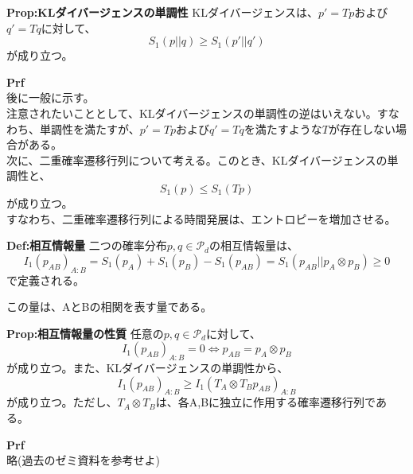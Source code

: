 \documentclass[a4paper,11pt]{jsarticle}
\numberwithin{equation}{section}
\begin{document}
\begin{itembox}[l]{\textbf{Prop:KLダイバージェンスの単調性}}
    KLダイバージェンスは、$p' = Tp$および$q' = Tq$に対して、
    \begin{equation}
        S_1(p||q) \geq S_1(p'||q')
    \end{equation}
    が成り立つ。
\end{itembox}
\textbf{Prf}\\
後に一般に示す。\\

注意されたいこととして、KLダイバージェンスの単調性の逆はいえない。すなわち、単調性を満たすが、$p' = Tp$および$q' = Tq$を満たすような$T$が存在しない場合がある。\\

次に、二重確率遷移行列について考える。このとき、KLダイバージェンスの単調性と、
\begin{equation}
    S_1(p) \leq S_1(Tp)
\end{equation}
が成り立つ。\\
すなわち、二重確率遷移行列による時間発展は、エントロピーを増加させる。\\

\begin{itembox}[l]{\textbf{Def:相互情報量}}
    二つの確率分布$p, q \in \mathcal{P}_d$の相互情報量は、
    \begin{equation}
        I_1 (p_{AB})_{A:B} = S_1 (p_A) + S_1 (p_B) - S_1 (p_{AB}) = S_1(p_{AB}||p_A \otimes p_B) \geq 0
    \end{equation}
    で定義される。
\end{itembox}
この量は、AとBの相関を表す量である。\\
\begin{itembox}[l]{\textbf{Prop:相互情報量の性質}}
    任意の$p, q \in \mathcal{P}_d$に対して、
    \begin{equation}
        I_1(p_{AB})_{A:B} =0 \Leftrightarrow p_{AB} = p_A \otimes p_B
    \end{equation}
    が成り立つ。また、KLダイバージェンスの単調性から、
    \begin{equation}
        I_1(p_{AB})_{A:B} \geq I_1(T_A \otimes T_B p_{AB})_{A:B}
    \end{equation}
    が成り立つ。ただし、$T_A \otimes T_B$は、各A,Bに独立に作用する確率遷移行列である。\\
    
\end{itembox}
\textbf{Prf}\\
略(過去のゼミ資料を参考せよ)\hfill \qedsymbol\\
\end{document}
